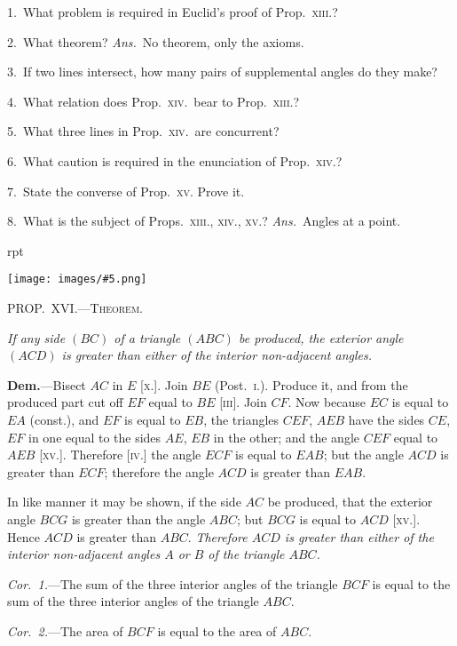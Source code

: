 \documentclass[oneside]{book}
\newcounter{wrapwidth}
\newcommand\mypropflot[5]{
\vspace{0.5\baselineskip}
\bigskip\Needspace*{4\baselineskip}
\setcounter{wrapwidth}{#3}
\begin{wrapfigure}[#4]{r}{\value{wrapwidth}pt}
\begin{center}
\vspace{-0.3in}
\texttt{[image: images/\#5.png]}
\end{center}
\end{wrapfigure}
\hspace{1.5\parindent}\textsc{#1}\par\medskip
\indent\emph{#2}\par\medskip
}
\begin{document}
\begin{footnotesize}
1.~What problem is required in Euclid's proof of Prop.~\textsc{xiii}.?

2.~What theorem? \textit{Ans.}\ No theorem, only the axioms.

3.~If two lines intersect, how many pairs of supplemental
angles do they make?


4.~What relation does Prop.~\textsc{xiv}.~bear to Prop.~\textsc{xiii}.?

5.~What three lines in Prop.~\textsc{xiv}.\ are concurrent?

6.~What caution is required in the enunciation of Prop.~\textsc{xiv}.?

7.~State the converse of Prop.~\textsc{xv}. Prove it.

8.~What is the subject of Props.~\textsc{xiii., xiv., xv.}? \textit{Ans.}\ Angles
at a point.
\par\end{footnotesize}


\mypropflot{PROP\@.~XVI\@.---Theorem.}{If any side $(BC)$ of a triangle $(ABC)$ be produced, the
exterior angle $(ACD)$ is greater than either of the interior\index{Angle!interior}
non-adjacent angles.}{110}{11}{f031}

\textbf{Dem.}---Bisect $AC$ in $E$ [\textsc{x}.]. Join $BE$ (Post.~\textsc{i}.).
Produce it, and from the produced
part cut off $EF$ equal to $BE$ [\textsc{iii}].
Join $CF$. Now because $EC$ is equal
to $EA$ (const.), and $EF$ is equal
to $EB$, the triangles $CEF$, $AEB$
have the sides $CE$, $EF$ in one
equal to the sides $AE$, $EB$ in the
other; and the angle $CEF$ equal
to $AEB$ [\textsc{xv}.]. Therefore [\textsc{iv}.]
the angle $ECF$ is equal to $EAB$;
but the angle $ACD$ is greater
than $ECF$; therefore the angle
$ACD$ is greater than $EAB$.

In like manner it may be shown, if the side $AC$ be
produced, that the exterior angle $BCG$ is greater than
the angle $ABC$; but $BCG$ is equal to $ACD$ [\textsc{xv}.]. Hence
$ACD$ is greater than $ABC$. \emph{Therefore $ACD$ is greater
than either of the interior non-adjacent angles $A$ or $B$ of
the triangle $ABC$.}

\textit{Cor.~1.}---The sum of the three interior angles of the
triangle $BCF$ is equal to the sum of the three interior
angles of the triangle $ABC$.

\textit{Cor.~2.}---The area of $BCF$ is equal to the area of
$ABC$.
\end{document}
